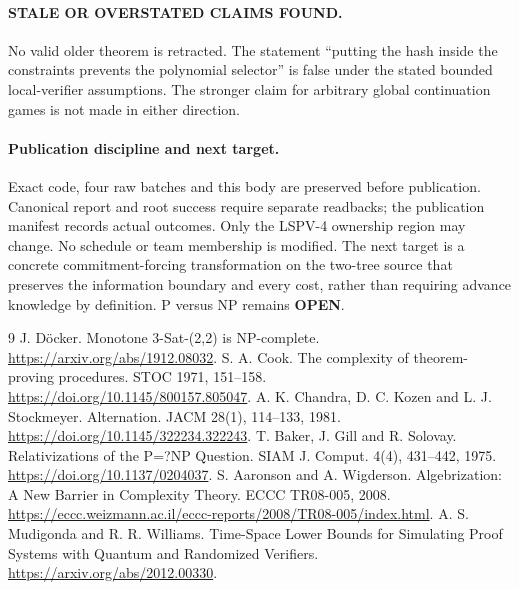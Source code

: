 \documentclass[11pt]{article}
\begin{document}
\paragraph{STALE OR OVERSTATED CLAIMS FOUND.}
No valid older theorem is retracted. The statement ``putting the hash inside
the constraints prevents the polynomial selector'' is false under the stated
bounded local-verifier assumptions. The stronger claim for arbitrary global
continuation games is not made in either direction.

\paragraph{Publication discipline and next target.}
Exact code, four raw batches and this body are preserved before publication.
Canonical report and root success require separate readbacks; the publication
manifest records actual outcomes. Only the LSPV-4 ownership region may change.
No schedule or team membership is modified. The next target is a concrete
commitment-forcing transformation on the two-tree source that preserves the
information boundary and every cost, rather than requiring advance knowledge
by definition. P versus NP remains \textbf{OPEN}.

\begin{thebibliography}{9}
 J. D\"ocker. Monotone 3-Sat-(2,2) is NP-complete.
\url{https://arxiv.org/abs/1912.08032}.
 S. A. Cook. The complexity of theorem-proving procedures.
STOC 1971, 151--158. \url{https://doi.org/10.1145/800157.805047}.
 A. K. Chandra, D. C. Kozen and L. J. Stockmeyer.
Alternation. JACM 28(1), 114--133, 1981.
\url{https://doi.org/10.1145/322234.322243}.
 T. Baker, J. Gill and R. Solovay. Relativizations of the
P=?NP Question. SIAM J. Comput. 4(4), 431--442, 1975.
\url{https://doi.org/10.1137/0204037}.
 S. Aaronson and A. Wigderson. Algebrization: A New Barrier
in Complexity Theory. ECCC TR08-005, 2008.
\url{https://eccc.weizmann.ac.il/eccc-reports/2008/TR08-005/index.html}.
 A. S. Mudigonda and R. R. Williams. Time-Space Lower Bounds
for Simulating Proof Systems with Quantum and Randomized Verifiers.
\url{https://arxiv.org/abs/2012.00330}.
\end{thebibliography}
\end{document}
